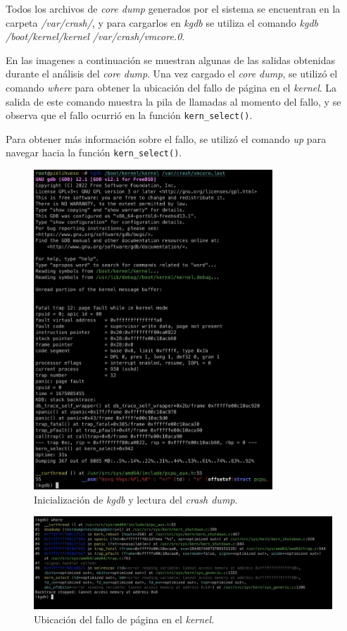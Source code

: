 Todos los archivos de \textit{core dump} generados por el sistema se encuentran en la carpeta \textit{/var/crash/}, y para cargarlos en \textit{kgdb} se utiliza el comando \textit{kgdb /boot/kernel/kernel /var/crash/vmcore.0}.

En las imagenes a continuación se muestran algunas de las salidas obtenidas durante el análisis del \textit{core dump}. Una vez cargado el \textit{core dump}, se utilizó el comando \textit{where} para obtener la ubicación del fallo de página en el \textit{kernel}. La salida de este comando muestra la pila de llamadas al momento del fallo, y se observa que el fallo ocurrió en la función \verb|kern_select()|.

Para obtener más información sobre el fallo, se utilizó el comando \textit{up} para navegar hacia la función \verb|kern_select()|.

\begin{figure}[H]
    \centering
    \includegraphics[width=0.8\textwidth]{images/kgdb_init.jpeg}
    \caption{Inicialización de \textit{kgdb} y lectura del \textit{crash dump}.}
    \label{fig:kgdb_init}
\end{figure}

\vspace{.50cm}
\begin{figure}[H]
    \centering
    \includegraphics[width=1\textwidth]{images/kgdb_where.jpeg}
    \caption{Ubicación del fallo de página en el \textit{kernel}.}
    \label{fig:kgdb_where}
\end{figure}

